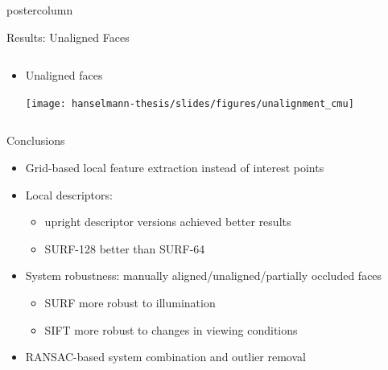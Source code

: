 \documentclass[final,hyperref={pdfpagelabels=false}]{beamer}
\begin{document}
\begin{frame}
\begin{columns}
\begin{column}{.33\textwidth}
\begin{beamercolorbox}[center,wd=\textwidth]{postercolumn}
\begin{minipage}[T]{.95\textwidth}
{\begin{block}{Results: Unaligned Faces}
\begin{columns}
\begin{column}{.39\textwidth}
\begin{itemize}
                  \item Unaligned faces

                      \texttt{[image: hanselmann-thesis/slides/figures/unalignment\_cmu]}

                  \end{itemize}
                \end{column}
              \end{columns}
            \end{block}
            \vfill
            \begin{block}{Conclusions}
              \begin{itemize}
              \item Grid-based local feature extraction instead of interest points
              \item Local descriptors:
                \begin{itemize}
                \item upright descriptor versions achieved better results
                \item SURF-128 better than SURF-64
                \end{itemize}
              \item System robustness: manually aligned/unaligned/partially occluded faces
                \begin{itemize}
                \item SURF more robust to illumination
                \item SIFT more robust to changes in viewing conditions
                \end{itemize}
              \item RANSAC-based system combination and outlier removal
              \end{itemize}
            \end{block}
          }
        \end{minipage}
      \end{beamercolorbox}
    \end{column}


\end{columns}
\end{frame}
\end{document}
